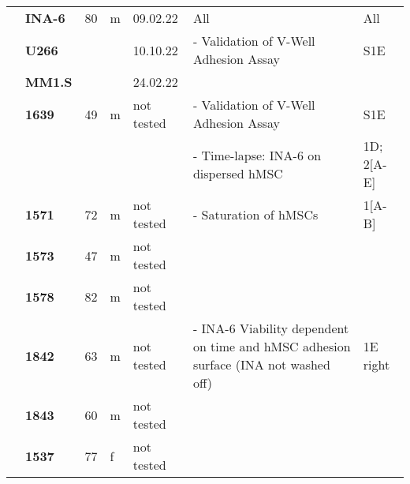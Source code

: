{\begin{longtable}{|>{\bfseries}p{1.5cm}|>{\bfseries}p{1.2cm}|p{1.2cm}|p{1cm}|p{2.3cm}|p{6cm}|p{1.7cm}|}
    \multirow{3}{1.5cm}{Myeloma Cell Line}
     & INA-6 & 80 & m & 09.02.22   & All                                                                                                      & All                                     \\
    \hhline{~------}
     & U266  &    &   & 10.10.22   & - Validation of V-Well Adhesion Assay                                                                    & S1E                                     \\
    \hhline{~----~~}
     & MM1.S &    &   & 24.02.22   &                                                                                                          &                                         \\
    \hline
    \multirow{3}{1.5cm}{hMSC}
     & 1639  & 49 & m & not tested & - Validation of V-Well Adhesion Assay                                                                    & S1E                                     \\
    \hhline{~~~~~--}
     &       &    &   &            & - Time-lapse: INA-6 on dispersed hMSC                                                                    & 1D; 2[A-E]                              \\
    \hhline{~------}
     & 1571  & 72 & m & not tested & - Saturation of hMSCs                                                                                    & 1[A-B]                                  \\
    \hhline{~----~~}
     & 1573  & 47 & m & not tested &                                                                                                          &                                         \\
    \hhline{~----~~}
     & 1578  & 82 & m & not tested &                                                                                                          &                                         \\
    \hhline{~------}
     & 1842  & 63 & m & not tested & - INA-6 Viability dependent on time and hMSC adhesion surface (INA not washed off)                       & 1E right                                \\
    \hhline{~----~~}
     & 1843  & 60 & m & not tested &                                                                                                          &                                         \\
    \hhline{~----~~}
     & 1537  & 77 & f & not tested &                                                                                                          &                                         \\

\end{longtable}}
